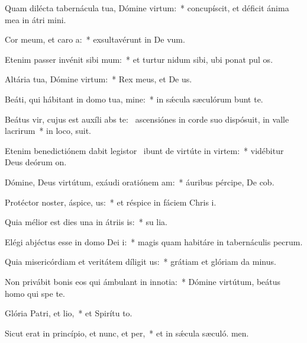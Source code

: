 \item Quam dilécta tabernácula tua, Dómine virtum:~* concupíscit, et déficit ánima mea in átri mini.
\item Cor meum, et caro a:~* exsultavérunt in De vum.
\item Etenim passer invénit sibi mum:~* et turtur nidum sibi, ubi ponat pul os.
\item Altária tua, Dómine virtum:~* Rex meus, et De us.
\item Beáti, qui hábitant in domo tua, mine:~* in sǽcula sæculórum bunt te.
\item Beátus vir, cujus est auxíli abs te:~\pscross{} ascensiónes in corde suo dispósuit, in valle lacrirum~* in loco,  suit.
\item Etenim benedictiónem dabit legistor~\pscross{} ibunt de virtúte in virtem:~* vidébitur Deus deórum  on.
\item Dómine, Deus virtútum, exáudi oratiónem am:~* áuribus pércipe, De cob.
\item Protéctor noster, áspice, us:~* et réspice in fáciem Chris i.
\item Quia mélior est dies una in átriis is:~* su lia.
\item Elégi abjéctus esse in domo Dei i:~* magis quam habitáre in tabernáculis pecrum.
\item Quia misericórdiam et veritátem díligit us:~* grátiam et glóriam da minus.
\item Non privábit bonis eos qui ámbulant in innotia:~* Dómine virtútum, beátus homo qui spe  te.
\item Glória Patri, et lio,~* et Spirítu to.
\item Sicut erat in princípio, et nunc, et per,~* et in sǽcula sæculó. men.
